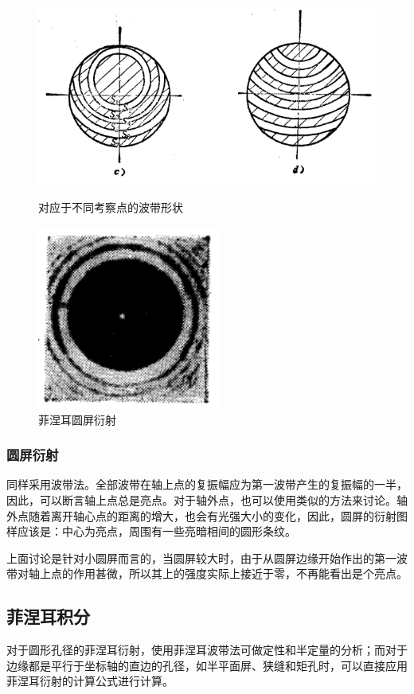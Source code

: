 \documentclass[UTF8]{ctexart}
\begin{document}
	\begin{figure}[H]
		\centering
		\includegraphics[width=12cm]{Diffraction_bodai.png}
		\caption{对应于不同考察点的波带形状}
		\label{figure_bodai}
		\includegraphics[width=6cm]{Diffraction_yuanping.png}
		\caption{菲涅耳圆屏衍射}
		\label{figure_yuanping}
	\end{figure}
	
	\subsubsection{圆屏衍射}
	同样采用波带法。全部波带在轴上点的复振幅应为第一波带产生的复振幅的一半，因此，可以断言轴上点总是亮点。对于轴外点，也可以使用类似的方法来讨论。轴外点随着离开轴心点的距离的增大，也会有光强大小的变化，因此，圆屏的衍射图样应该是：中心为亮点，周围有一些亮暗相间的圆形条纹。
	
	上面讨论是针对小圆屏而言的，当圆屏较大时，由于从圆屏边缘开始作出的第一波带对轴上点的作用甚微，所以其上的强度实际上接近于零，不再能看出是个亮点。
	
	\subsection{菲涅耳积分}
	对于圆形孔径的菲涅耳衍射，使用菲涅耳波带法可做定性和半定量的分析；而对于边缘都是平行于坐标轴的直边的孔径，如半平面屏、狭缝和矩孔时，可以直接应用菲涅耳衍射的计算公式进行计算。
	
\end{document}
